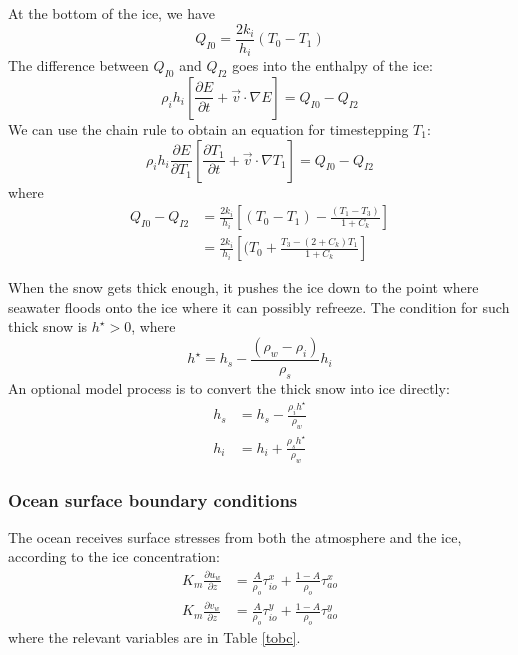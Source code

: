 At the bottom of the ice, we have
\begin{equation}
  Q_{I0} = \frac{2 k_i }{ h_i} (T_0 - T_1)
\end{equation}
The difference between $Q_{I0}$ and $Q_{I2}$ goes into the enthalpy of
the ice:
\begin{equation}
   \rho_i h_i \left[ \frac{\partial E }{ \partial t} + \vec{v} \cdot 
   \nabla E \right] = Q_{I0} - Q_{I2}
  \label{eqdEdt}
\end{equation}
We can use the chain rule to obtain an equation for timestepping $T_1$:
\begin{equation}
   \rho_i h_i \frac{\partial E }{ \partial T_1}
   \left[ \frac{\partial T_1 }{ \partial t} + \vec{v} \cdot 
   \nabla T_1 \right] = Q_{I0} - Q_{I2}
\end{equation}
where
\begin{align*}
  Q_{I0} - Q_{I2} & = \frac{2 k_i }{ h_i} \left[ (T_0 - T_1) - 
  \frac{(T_1 - T_3) }{ 1 + C_k} \right] \\
	          & = \frac{2 k_i }{ h_i} \left[ (T_0 +
  \frac{T_3 - (2 + C_k) T_1 }{ 1 + C_k} \right]
\end{align*}

When the snow gets thick enough, it pushes the ice down to the point
where seawater floods onto the ice where it can possibly refreeze.
The condition for such thick snow is $h^\star > 0$, where
\begin{equation}
    h^\star = h_s - \frac{(\rho_w - \rho_i)}{\rho_s} h_i
\end{equation}
An optional model process is to convert the thick snow into ice
directly:
\begin{align}
    h_s & = h_s - \frac{\rho_i h^\star}{\rho_w} \\
    h_i & = h_i + \frac{\rho_s h^\star}{\rho_w}
\end{align}

\subsubsection{Ocean surface boundary conditions}
The ocean receives surface stresses from both the atmosphere and the
ice, according to the ice concentration:
\begin{align}
   K_m \frac{\partial u_w }{ \partial z} & = \frac{A }{ \rho_o} \tau_{io}^x
    + \frac{1-A }{ \rho_o} \tau_{ao}^x \\
   K_m \frac{\partial v_w }{ \partial z} & = \frac{A }{ \rho_o} \tau_{io}^y
    + \frac{1-A }{ \rho_o} \tau_{ao}^y
\end{align}
where the relevant variables are in Table \ref{tobc}.

